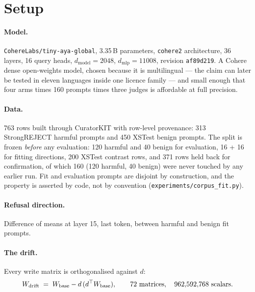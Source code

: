 \documentclass[10pt,a4paper]{article}
\newcommand{\code}[1]{\texttt{\small #1}}
\begin{document}
\section{Setup}

\paragraph{Model.} \code{CohereLabs/tiny-aya-global}, 3.35\,B parameters, \code{cohere2}
architecture, 36 layers, 16 query heads, $d_{\text{model}}=2048$, $d_{\text{mlp}}=11008$, revision
\code{af89d219}. A Cohere dense open-weights model, chosen because it is multilingual --- the claim
can later be tested in eleven languages inside one licence family --- and small enough that four arms
times 160 prompts times three judges is affordable at full precision.

\paragraph{Data.} 763 rows built through CuratorKIT with row-level provenance: 313 StrongREJECT
harmful prompts and 450 XSTest benign prompts. The split is frozen \emph{before} any evaluation:
120 harmful and 40 benign for evaluation, 16 + 16 for fitting directions, 200 XSTest contrast rows,
and 371 rows held back for confirmation, of which 160 (120 harmful, 40 benign) were never touched by
any earlier run. Fit and evaluation prompts are disjoint by construction, and the property is
asserted by code, not by convention (\code{experiments/corpus\_fit.py}).

\paragraph{Refusal direction.} Difference of means at layer 15, last token, between harmful and
benign fit prompts.

\paragraph{The drift.} Every write matrix is orthogonalised against $d$:
\begin{equation}
W_{\text{drift}} \;=\; W_{\text{base}} - d\,(d^{\top} W_{\text{base}}),
\qquad
\text{72 matrices},\quad 962{,}592{,}768 \text{ scalars}.
\end{equation}
\end{document}
